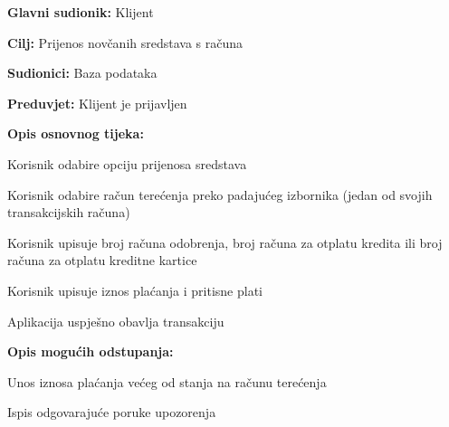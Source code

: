     			
    			\noindent {}
    			\begin{packed_item}
    				
    				\item \textbf{Glavni sudionik: }Klijent
    				\item  \textbf{Cilj:} Prijenos novčanih sredstava s računa
    				\item  \textbf{Sudionici:} Baza podataka
    				\item  \textbf{Preduvjet:} Klijent je prijavljen
    				\item  \textbf{Opis osnovnog tijeka:}
    				
    				\item[] \begin{packed_enum}
    					
    					\item Korisnik odabire opciju prijenosa sredstava
    					\item Korisnik odabire račun terećenja preko padajućeg izbornika (jedan od svojih transakcijskih računa)
    					\item Korisnik upisuje broj računa odobrenja, broj računa za otplatu kredita ili broj računa za otplatu kreditne kartice
    					\item Korisnik upisuje iznos plaćanja i pritisne plati
    					\item Aplikacija uspješno obavlja transakciju 
    					
    				\end{packed_enum}
    					
    				
    						\item  \textbf{Opis mogućih odstupanja:}
    					
    					\item[] \begin{packed_item}
    						
    						\item[4.a] Unos iznosa plaćanja većeg od stanja na računu terećenja
    						\item[] \begin{packed_enum}
    							
    							\item Ispis odgovarajuće poruke upozorenja
    							
    							
    						\end{packed_enum}
    						
    						
    					\end{packed_item}
    					
    			
    				
    			\end{packed_item}    		
    		

